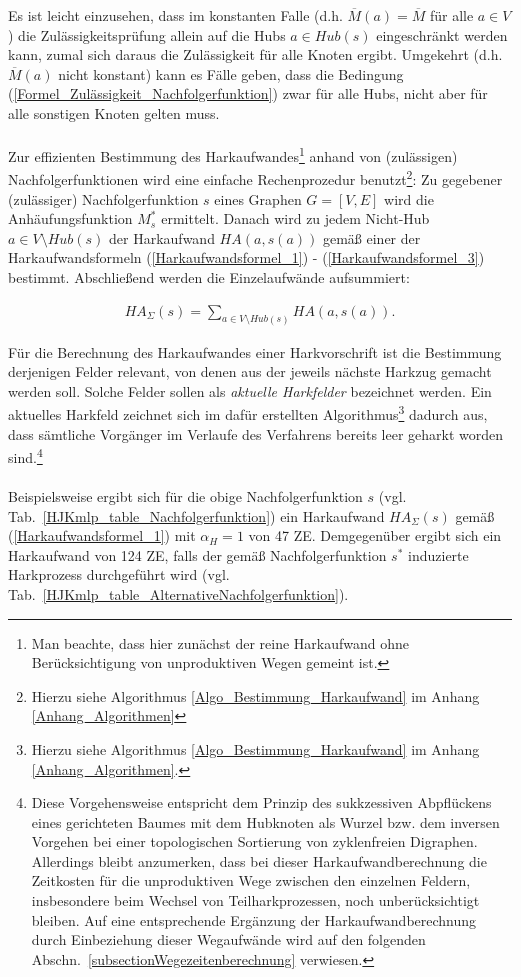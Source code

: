 \documentclass[fontsize=12pt,doubleside,openany,listof=totoc,listof=flat,listof=nochaptergap,numbers=noenddot]{scrbook}
\theoremstyle{style}
\begin{document}
\noindent Es ist leicht einzusehen, dass im konstanten Falle (d.h. $\overline{M}(a)=\overline{M}$ für alle $a \in V$) die Zulässigkeitsprüfung allein auf die Hubs $a \in Hub(s)$ eingeschränkt werden kann, zumal sich daraus die Zulässigkeit für alle Knoten ergibt. Umgekehrt (d.h. $\overline{M}(a)$ nicht konstant) kann es Fälle geben, dass die Bedingung (\ref{Formel_Zulässigkeit_Nachfolgerfunktion}) zwar für alle Hubs, nicht aber für alle sonstigen Knoten gelten muss. \\ 
\\
Zur effizienten Bestimmung des Harkaufwandes\footnote{Man beachte, dass hier zunächst der reine Harkaufwand ohne Berücksichtigung von unproduktiven Wegen gemeint ist.} anhand von (zulässigen) Nachfolgerfunktionen wird eine einfache Rechenprozedur benutzt\footnote{Hierzu siehe Algorithmus \ref{Algo_Bestimmung_Harkaufwand} im Anhang \ref{Anhang_Algorithmen}}: 
Zu gegebener (zulässiger) Nachfolgerfunktion $s$ eines Graphen $G=[V,E]$ wird die Anhäufungsfunktion $M^*_s$ ermittelt. Danach wird zu jedem Nicht-Hub $a \in V\setminus Hub(s)$ der Harkaufwand $HA(a,s(a))$ gemäß einer der Harkaufwandsformeln (\ref{Harkaufwandsformel_1}) - (\ref{Harkaufwandsformel_3}) bestimmt. Abschließend werden die Einzelaufwände aufsummiert: 

\begin{align}
HA_{\Sigma}(s) = \sum_{a \in V\setminus Hub(s)}{HA(a,s(a))}. \label{Formel_Harkaufwandsumme}
\end{align}

\noindent Für die Berechnung des Harkaufwandes einer Harkvorschrift ist die Bestimmung 
derjenigen Felder relevant, von denen aus der jeweils nächste Harkzug gemacht werden soll. 
Solche Felder sollen als \textit{aktuelle Harkfelder} bezeichnet werden. Ein aktuelles Harkfeld
zeichnet sich im dafür erstellten Algorithmus\footnote{Hierzu siehe Algorithmus \ref{Algo_Bestimmung_Harkaufwand} im Anhang \ref{Anhang_Algorithmen}.} dadurch aus, dass sämtliche Vorgänger im Verlaufe des Verfahrens bereits leer geharkt worden sind.\footnote{Diese Vorgehensweise entspricht dem Prinzip des sukkzessiven Abpflückens eines 
gerichteten Baumes mit dem Hubknoten als Wurzel bzw. dem inversen Vorgehen bei einer topologischen Sortierung von zyklenfreien Digraphen. Allerdings bleibt anzumerken, dass bei dieser Harkaufwandberechnung die Zeitkosten für die unproduktiven Wege zwischen den einzelnen Feldern, insbesondere beim Wechsel von Teilharkprozessen, noch unberücksichtigt bleiben. Auf eine entsprechende Ergänzung der Harkaufwandberechnung durch Einbeziehung dieser Wegaufwände wird auf den folgenden Abschn.~\ref{subsectionWegezeitenberechnung} verwiesen.} 
\\ \\
Beispielsweise ergibt sich für die obige Nachfolgerfunktion $s$ (vgl.
Tab.~\ref{HJKmlp_table_Nachfolgerfunktion}) ein Harkaufwand $HA_\Sigma (s)$ gemäß
(\ref{Harkaufwandsformel_1}) mit $\alpha_H=1$ von 47 ZE.
Demgegenüber ergibt sich ein Harkaufwand von 124 ZE, falls der gemäß
Nachfolgerfunktion $s^*$ induzierte Harkprozess durchgeführt wird (vgl.
Tab.~\ref{HJKmlp_table_AlternativeNachfolgerfunktion}).
\end{document}
